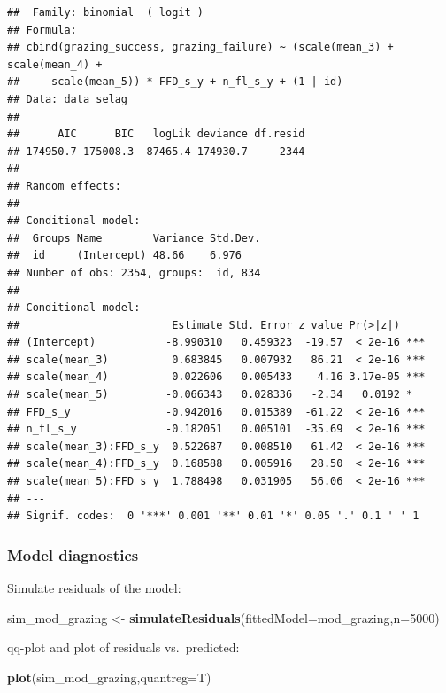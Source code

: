 \documentclass[
]{article}
\newenvironment{Shaded}{\begin{snugshade}}{\end{snugshade}}
\newcommand{\DataTypeTok}[1]{\textcolor[rgb]{0.13,0.29,0.53}{#1}}
\newcommand{\DecValTok}[1]{\textcolor[rgb]{0.00,0.00,0.81}{#1}}
\newcommand{\KeywordTok}[1]{\textcolor[rgb]{0.13,0.29,0.53}{\textbf{#1}}}
\newcommand{\NormalTok}[1]{#1}
\newcommand{\StringTok}[1]{\textcolor[rgb]{0.31,0.60,0.02}{#1}}
\begin{document}
\begin{verbatim}
##  Family: binomial  ( logit )
## Formula:          
## cbind(grazing_success, grazing_failure) ~ (scale(mean_3) + scale(mean_4) +  
##     scale(mean_5)) * FFD_s_y + n_fl_s_y + (1 | id)
## Data: data_selag
## 
##      AIC      BIC   logLik deviance df.resid 
## 174950.7 175008.3 -87465.4 174930.7     2344 
## 
## Random effects:
## 
## Conditional model:
##  Groups Name        Variance Std.Dev.
##  id     (Intercept) 48.66    6.976   
## Number of obs: 2354, groups:  id, 834
## 
## Conditional model:
##                        Estimate Std. Error z value Pr(>|z|)    
## (Intercept)           -8.990310   0.459323  -19.57  < 2e-16 ***
## scale(mean_3)          0.683845   0.007932   86.21  < 2e-16 ***
## scale(mean_4)          0.022606   0.005433    4.16 3.17e-05 ***
## scale(mean_5)         -0.066343   0.028336   -2.34   0.0192 *  
## FFD_s_y               -0.942016   0.015389  -61.22  < 2e-16 ***
## n_fl_s_y              -0.182051   0.005101  -35.69  < 2e-16 ***
## scale(mean_3):FFD_s_y  0.522687   0.008510   61.42  < 2e-16 ***
## scale(mean_4):FFD_s_y  0.168588   0.005916   28.50  < 2e-16 ***
## scale(mean_5):FFD_s_y  1.788498   0.031905   56.06  < 2e-16 ***
## ---
## Signif. codes:  0 '***' 0.001 '**' 0.01 '*' 0.05 '.' 0.1 ' ' 1
\end{verbatim}

\hypertarget{model-diagnostics-2}{%
\subsubsection{Model diagnostics}\label{model-diagnostics-2}}

Simulate residuals of the model:

\begin{Shaded}
\begin{Highlighting}[]
\NormalTok{sim\_mod\_grazing \textless{}{-}}\StringTok{ }\KeywordTok{simulateResiduals}\NormalTok{(}\DataTypeTok{fittedModel=}\NormalTok{mod\_grazing,}\DataTypeTok{n=}\DecValTok{5000}\NormalTok{)}
\end{Highlighting}
\end{Shaded}

qq-plot and plot of residuals vs.~predicted:

\begin{Shaded}
\begin{Highlighting}[]
\KeywordTok{plot}\NormalTok{(sim\_mod\_grazing,}\DataTypeTok{quantreg=}\NormalTok{T)}
\end{Highlighting}
\end{Shaded}
\end{document}
